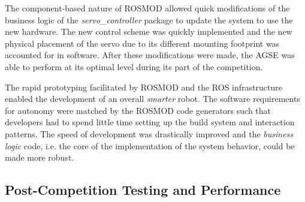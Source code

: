 The component-based nature of ROSMOD allowed quick modifications of the business logic of the \emph{servo\_controller} package to update the system to use the new hardware.  The new control scheme was quickly implemented and the new physical placement of the servo due to its different mounting footprint was accounted for in software. After these modifications were made, the AGSE was able to perform at its optimal level during its part of the competition.

The rapid prototyping facilitated by ROSMOD and the ROS infrastructure enabled the development of an overall \emph{smarter} robot. The software requirements for autonomy were matched by the ROSMOD code generators such that developers had to spend little time setting up the build system and interaction patterns. The speed of development was drastically improved and the \emph{business logic} code, i.e. the core of the implementation of the system behavior, could be made more robust.

\subsection{Post-Competition Testing and Performance}
